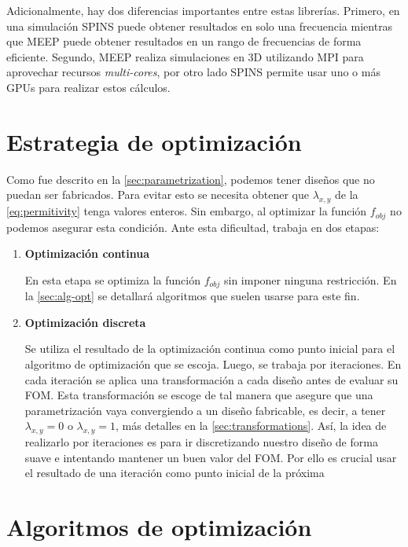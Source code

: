 Adicionalmente, hay dos diferencias importantes entre estas librerías.
Primero, en una simulación SPINS puede obtener resultados en solo una
frecuencia mientras que MEEP puede obtener resultados en un rango de
frecuencias de forma eficiente.
Segundo, MEEP realiza simulaciones en 3D utilizando MPI para aprovechar
recursos \emph{multi-cores}, por otro lado SPINS permite usar uno o más GPUs
para realizar estos cálculos.

\section{Estrategia de optimización}\label{sec:estrategia-optimizacion}

Como fue descrito en la \autoref{sec:parametrization}, podemos
tener diseños que no puedan ser fabricados.
Para evitar esto se necesita obtener que $\lambda_{x, y}$ de la \autoref{eq:permitivity} tenga valores enteros.
Sin embargo, al optimizar la función $f_{obj}$ no podemos asegurar esta condición.
Ante esta dificultad, \cite{Su2020} trabaja en dos etapas:


\begin{enumerate}

\item{\textbf{Optimización continua}}

En esta etapa se optimiza la función $f_{obj}$ sin imponer ninguna restricción.
    En la \autoref{sec:alg-opt} se detallará algoritmos que suelen usarse para este fin.

\item{\textbf{Optimización discreta}}

Se utiliza el resultado de la optimización continua como punto inicial para el algoritmo de optimización que se escoja.
Luego, se trabaja por iteraciones.
En cada iteración se aplica una transformación a cada diseño antes de evaluar su FOM.
Esta transformación se escoge de tal manera que asegure que una
parametrización vaya convergiendo a un diseño fabricable, es decir,
a tener $\lambda_{x, y} = 0$ o $\lambda_{x, y} = 1$, más detalles en la \autoref{sec:transformations}.
Así, la idea de realizarlo por iteraciones es para ir discretizando nuestro diseño
de forma suave e intentando mantener un buen valor del FOM.
Por ello es crucial usar el resultado de una iteración como punto inicial de la próxima

\end{enumerate}

\section{Algoritmos de optimización}\label{sec:alg-opt}

